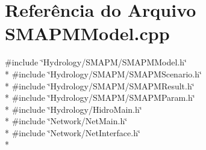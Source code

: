 \section{Referência do Arquivo S\+M\+A\+P\+M\+Model.\+cpp}
\label{_s_m_a_p_m_model_8cpp}
{\ttfamily \#include \char`\"{}Hydrology/\+S\+M\+A\+P\+M/\+S\+M\+A\+P\+M\+Model.\+h\char`\"{}}\\*
{\ttfamily \#include \char`\"{}Hydrology/\+S\+M\+A\+P\+M/\+S\+M\+A\+P\+M\+Scenario.\+h\char`\"{}}\\*
{\ttfamily \#include \char`\"{}Hydrology/\+S\+M\+A\+P\+M/\+S\+M\+A\+P\+M\+Result.\+h\char`\"{}}\\*
{\ttfamily \#include \char`\"{}Hydrology/\+S\+M\+A\+P\+M/\+S\+M\+A\+P\+M\+Param.\+h\char`\"{}}\\*
{\ttfamily \#include \char`\"{}Hydrology/\+Hidro\+Main.\+h\char`\"{}}\\*
{\ttfamily \#include \char`\"{}Network/\+Net\+Main.\+h\char`\"{}}\\*
{\ttfamily \#include \char`\"{}Network/\+Net\+Interface.\+h\char`\"{}}\\*
